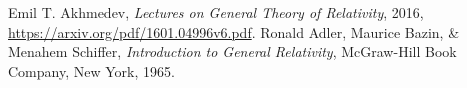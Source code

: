 \documentclass[]{article}
\begin{document}
\begin{thebibliography}{9}
	
	Emil T. Akhmedev,
	\emph{Lectures on General Theory of Relativity},
	2016,
	\url{https://arxiv.org/pdf/1601.04996v6.pdf}.
	Ronald Adler, Maurice Bazin, \& Menahem Schiffer,
	\emph{Introduction to General Relativity},
	McGraw-Hill Book Company, New York,
	1965.
	
	
\end{thebibliography}
\end{document}

